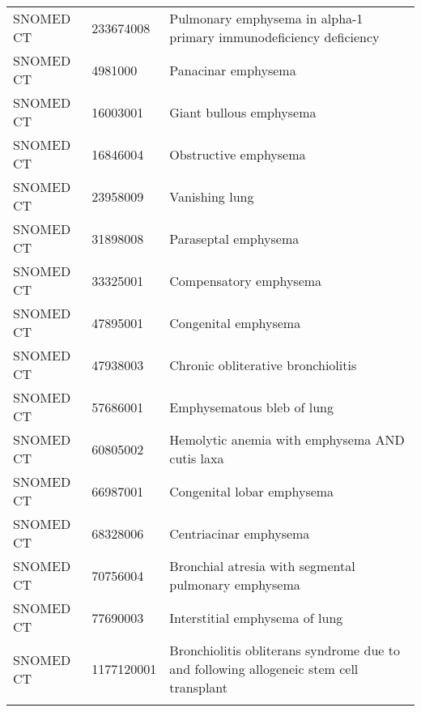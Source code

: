 \begin{longtable}{p{}p{}p{}}
  SNOMED CT & 233674008 & Pulmonary emphysema in alpha-1 primary immunodeficiency deficiency \\ 
  SNOMED CT & 4981000 & Panacinar emphysema \\ 
  SNOMED CT & 16003001 & Giant bullous emphysema \\ 
  SNOMED CT & 16846004 & Obstructive emphysema \\ 
  SNOMED CT & 23958009 & Vanishing lung \\ 
  SNOMED CT & 31898008 & Paraseptal emphysema \\ 
  SNOMED CT & 33325001 & Compensatory emphysema \\ 
  SNOMED CT & 47895001 & Congenital emphysema \\ 
  SNOMED CT & 47938003 & Chronic obliterative bronchiolitis \\ 
  SNOMED CT & 57686001 & Emphysematous bleb of lung \\ 
  SNOMED CT & 60805002 & Hemolytic anemia with emphysema AND cutis laxa \\ 
  SNOMED CT & 66987001 & Congenital lobar emphysema \\ 
  SNOMED CT & 68328006 & Centriacinar emphysema \\ 
  SNOMED CT & 70756004 & Bronchial atresia with segmental pulmonary emphysema \\ 
  SNOMED CT & 77690003 & Interstitial emphysema of lung \\ 
  SNOMED CT & 1177120001 & Bronchiolitis obliterans syndrome due to and following allogeneic stem cell transplant \\ 
  \hline
\label{tab:codes_chronic-obstructive-pulmonary-disease}
\end{longtable}
